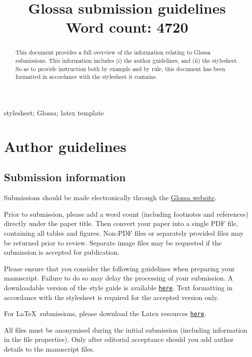 \documentclass[charis,linguex]{glossa}
\title[Glossa guidelines]{Glossa submission guidelines\\ \bigskip \large Word count: 4720}
\author[Paul \& Vanden Wyngaerd]%
{%
  \spauthor{Waltraud Paul\\ 
  \institute{CRLAO, CNRS-EHESS-INALCO}\\
  \small{%
  waltraud.paul@ehess.fr}
  }
  \AND
  \spauthor{Guido Vanden Wyngaerd \\
  \institute{KU Leuven}\\
  \small{%
  guido.vandenwyngaerd@kuleuven.be}
  }%
}
\begin{document}
\sffamily
\maketitle


\begin{abstract}
This document provides a full overview of the information relating to Glossa submissions. This information includes (i) the author guidelines, and (ii) the stylesheet. So as to provide instruction both by example and by rule, this document has been formatted in accordance with the stylesheet it contains.
\end{abstract}

\begin{keywords}
  stylesheet; Glossa; latex template
\end{keywords}

\rmfamily


\section{Author guidelines}
\subsection{Submission information}

Submissions should be made electronically through the \href{http://glossa.ubiquitypress.com}{Glossa website}. 

Prior to submission, please add a word count (including footnotes and references) directly under the paper title. Then convert your paper into a single PDF file, containing all tables and figures. Non-PDF files or separately provided files may be returned prior to review. Separate image files may be requested if the submission is accepted for publication.

Please ensure that you consider the following guidelines when preparing your manuscript. Failure to do so may delay the processing of your submission. A downloadable version of the style guide is available \href{https://github.com/guidovw/Glossalatex/blob/master/glossa-template.pdf}{\texttt{here}}. Text formatting in accordance with  the stylesheet is required for the accepted version only.


For \LaTeX\ submissions, please download the Latex resources \href{https://github.com/guidovw/Glossalatex}{\texttt{here}}.

All files must be anonymised during the initial submission (including information in the file properties). Only after editorial acceptance should you add author details to the manuscript files. 
\end{document}
